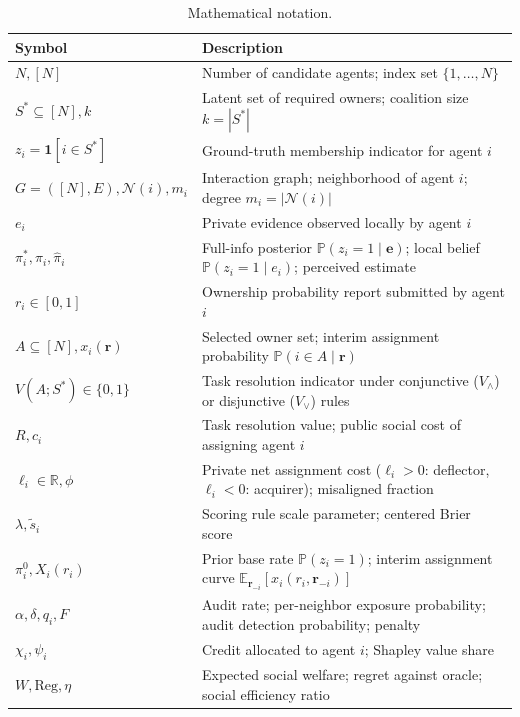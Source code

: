 \documentclass{article}
\theoremstyle{definition}
\begin{document}
\begin{table}[t]
\centering
\small
\caption{Mathematical notation.}
\label{tab:notation}
\begin{tabularx}{\textwidth}{lX}
\toprule
\textbf{Symbol} & \textbf{Description} \\
\midrule
$N, [N]$ & Number of candidate agents; index set $\{1, \dots, N\}$ \\
$S^* \subseteq [N], k$ & Latent set of required owners; coalition size $k = |S^*|$ \\
$z_i = \mathbf{1}[i \in S^*]$ & Ground-truth membership indicator for agent $i$ \\
$G = ([N], E), \mathcal{N}(i), m_i$ & Interaction graph; neighborhood of agent $i$; degree $m_i = |\mathcal{N}(i)|$ \\
$e_i$ & Private evidence observed locally by agent $i$ \\
$\pi_i^*, \pi_i, \hat{\pi}_i$ & Full-info posterior $\mathbb{P}(z_i=1 \mid \mathbf{e})$; local belief $\mathbb{P}(z_i=1 \mid e_i)$; perceived estimate \\
$r_i \in [0, 1]$ & Ownership probability report submitted by agent $i$ \\
$A \subseteq [N], x_i(\mathbf{r})$ & Selected owner set; interim assignment probability $\mathbb{P}(i \in A \mid \mathbf{r})$ \\
$V(A; S^*) \in \{0, 1\}$ & Task resolution indicator under conjunctive ($V_\wedge$) or disjunctive ($V_\vee$) rules \\
$R, c_i$ & Task resolution value; public social cost of assigning agent $i$ \\
$\ell_i \in \mathbb{R}, \phi$ & Private net assignment cost ($\ell_i > 0$: deflector, $\ell_i < 0$: acquirer); misaligned fraction \\
$\lambda, \tilde{s}_i$ & Scoring rule scale parameter; centered Brier score \\
$\pi_i^0, X_i(r_i)$ & Prior base rate $\mathbb{P}(z_i = 1)$; interim assignment curve $\mathbb{E}_{\mathbf{r}_{-i}}[x_i(r_i, \mathbf{r}_{-i})]$ \\
$\alpha, \delta, q_i, F$ & Audit rate; per-neighbor exposure probability; audit detection probability; penalty \\
$\chi_i, \psi_i$ & Credit allocated to agent $i$; Shapley value share \\
$W, \mathrm{Reg}, \eta$ & Expected social welfare; regret against oracle; social efficiency ratio \\
\bottomrule
\end{tabularx}
\end{table}
\end{document}
